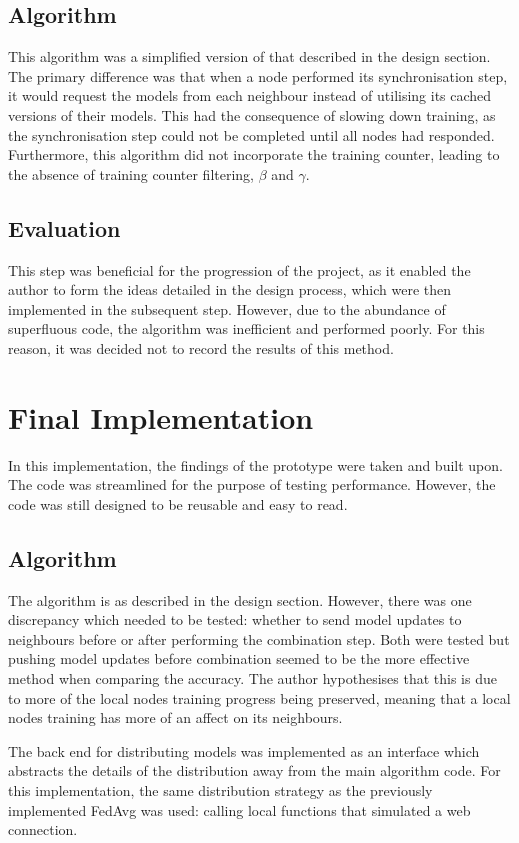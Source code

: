 \subsection{Algorithm} \label{reasonforcache}
This algorithm was a simplified version of that described in the design section. The primary difference was that when a node performed its synchronisation step, it would request the models from each neighbour instead of utilising its cached versions of their models. This had the consequence of slowing down training, as the synchronisation step could not be completed until all nodes had responded. Furthermore, this algorithm did not incorporate the training counter, leading to the absence of training counter filtering, $\beta$ and $\gamma$.

\subsection{Evaluation}
This step was beneficial for the progression of the project, as it enabled the author to form the ideas detailed in the design process, which were then implemented in the subsequent step. However, due to the abundance of superfluous code, the algorithm was inefficient and performed poorly. For this reason, it was decided not to record the results of this method.

\section{Final Implementation}
In this implementation, the findings of the prototype were taken and built upon. The code was streamlined for the purpose of testing performance. However, the code was still designed to be reusable and easy to read.

\subsection{Algorithm}
The algorithm is as described in the design section. However, there was one discrepancy which needed to be tested: whether to send model updates to neighbours before or after performing the combination step. Both were tested but pushing model updates before combination seemed to be the more effective method when comparing the accuracy. The author hypothesises that this is due to more of the local nodes training progress being preserved, meaning that a local nodes training has more of an affect on its neighbours.

The back end for distributing models was implemented as an interface which abstracts the details of the distribution away from the main algorithm code. For this implementation, the same distribution strategy as the previously implemented FedAvg was used: calling local functions that simulated a web connection.

